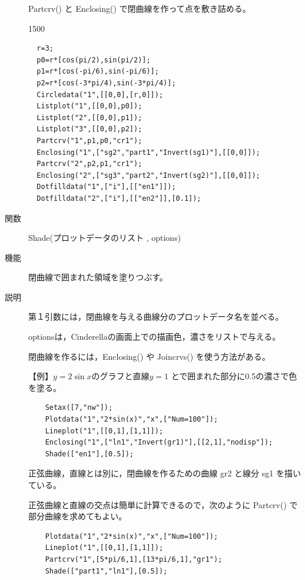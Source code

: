 \documentclass[papersize,a4paper,12pt,uplatex]{jsarticle}
\begin{document}
\begin{description}
Partcrv() と Enclosing() で閉曲線を作って点を敷き詰める。

\begin{layer}{150}{0}
\end{layer}
\begin{verbatim}
  r=3;
  p0=r*[cos(pi/2),sin(pi/2)];
  p1=r*[cos(-pi/6),sin(-pi/6)];
  p2=r*[cos(-3*pi/4),sin(-3*pi/4)];
  Circledata("1",[[0,0],[r,0]]);
  Listplot("1",[[0,0],p0]);
  Listplot("2",[[0,0],p1]);
  Listplot("3",[[0,0],p2]);
  Partcrv("1",p1,p0,"cr1");
  Enclosing("1",["sg2","part1","Invert(sg1)"],[[0,0]]);
  Partcrv("2",p2,p1,"cr1");
  Enclosing("2",["sg3","part2","Invert(sg2)"],[[0,0]]);
  Dotfilldata("1",["i"],[["en1"]]);
  Dotfilldata("2",["i"],[["en2"]],[0.1]);
\end{verbatim}

\vspace{\baselineskip}
\hypertarget{shade}{}
\item[関数]  Shade(プロットデータのリスト , options)
\item[機能]  閉曲線で囲まれた領域を塗りつぶす。
\item[説明]  第１引数には，閉曲線を与える曲線分のプロットデータ名を並べる。

  optionsは，Cinderellaの画面上での描画色，濃さをリストで与える。
  
  閉曲線を作るには，Enclosing() や Joincrvs() を使う方法がある。

\vspace{\baselineskip}
【例】$y=2\sin x$のグラフと直線$y=1$ とで囲まれた部分に0.5の濃さで色を塗る。
\begin{verbatim}
    Setax([7,"nw"]);
    Plotdata("1","2*sin(x)","x",["Num=100"]);
    Lineplot("1",[[0,1],[1,1]]);
    Enclosing("1",["ln1","Invert(gr1)"],[[2,1],"nodisp"]);
    Shade(["en1"],[0.5]);
\end{verbatim}
\begin{center}  \end{center}

正弦曲線，直線とは別に，閉曲線を作るための曲線 gr2 と線分 sg1 を描いている。

正弦曲線と直線の交点は簡単に計算できるので，次のように Partcrv() で部分曲線を求めてもよい。
\begin{verbatim}
    Plotdata("1","2*sin(x)","x",["Num=100"]);
    Lineplot("1",[[0,1],[1,1]]);
    Partcrv("1",[5*pi/6,1],[13*pi/6,1],"gr1");
    Shade(["part1","ln1"],[0.5]);
\end{verbatim}


\end{description}
\end{document}
